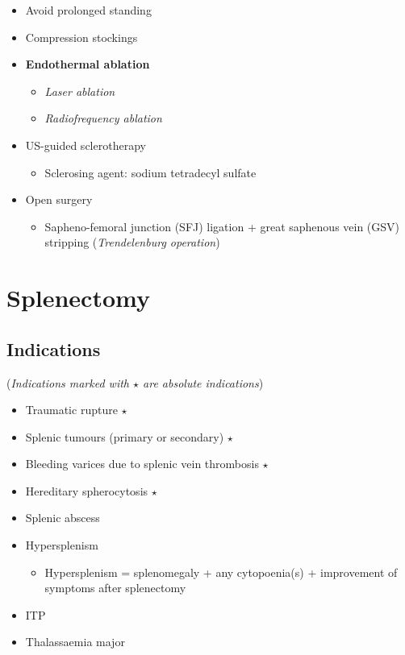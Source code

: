 \documentclass[
  14pt,
]{extarticle}
\providecommand{\tightlist}{%
  \setlength{\itemsep}{0pt}\setlength{\parskip}{0pt}}
\begin{document}
\begin{itemize}
\tightlist
\item
  Avoid prolonged standing
\item
  Compression stockings
\item
  \textbf{Endothermal ablation}

  \begin{itemize}
  \tightlist
  \item
    \emph{Laser ablation}
  \item
    \emph{Radiofrequency ablation}
  \end{itemize}
\item
  US-guided sclerotherapy

  \begin{itemize}
  \tightlist
  \item
    Sclerosing agent: sodium tetradecyl sulfate
  \end{itemize}
\item
  Open surgery

  \begin{itemize}
  \tightlist
  \item
    Sapheno-femoral junction (SFJ) ligation + great saphenous vein (GSV)
    stripping (\emph{Trendelenburg operation})
  \end{itemize}
\end{itemize}

\pagebreak

\hypertarget{splenectomy}{%
\section{Splenectomy}\label{splenectomy}}

\hypertarget{indications-2}{%
\subsection{Indications}\label{indications-2}}

(\emph{Indications marked with \(\star\) are absolute indications})

\begin{itemize}
\tightlist
\item
  Traumatic rupture \(\star\)
\item
  Splenic tumours (primary or secondary) \(\star\)
\item
  Bleeding varices due to splenic vein thrombosis \(\star\)
\item
  Hereditary spherocytosis \(\star\)
\item
  Splenic abscess
\item
  Hypersplenism

  \begin{itemize}
  \tightlist
  \item
    Hypersplenism = splenomegaly + any cytopoenia(s) + improvement of
    symptoms after splenectomy
  \end{itemize}
\item
  ITP
\item
  Thalassaemia major
\end{itemize}
\end{document}
